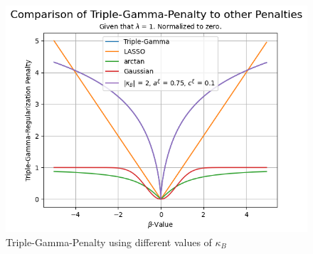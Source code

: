 \documentclass[12pt,a4paper]{article}
\begin{document}
\begin{figure}[!h]
\centering
\includegraphics[scale=0.75]{../02_simulation/021_simulation_figures/TGPenalty_ChangeInKappa.png}
\caption{Triple-Gamma-Penalty using different values of $\kappa_B$}
\label{fig:basicTGPen}
\end{figure}
\end{document}

